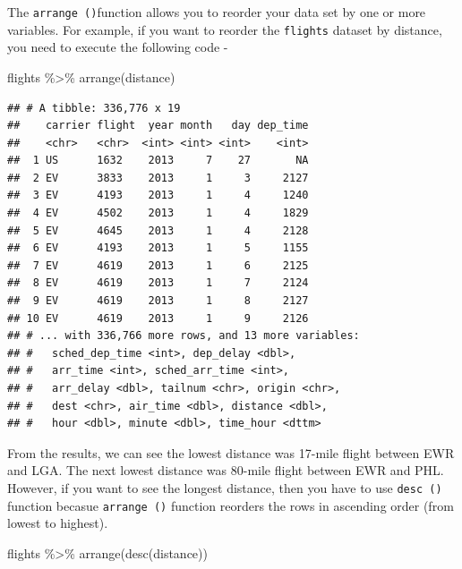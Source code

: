 \documentclass[
]{book}
\newenvironment{Shaded}{\begin{snugshade}}{\end{snugshade}}
\newcommand{\FunctionTok}[1]{\textcolor[rgb]{0.00,0.00,0.00}{#1}}
\newcommand{\NormalTok}[1]{#1}
\newcommand{\SpecialCharTok}[1]{\textcolor[rgb]{0.00,0.00,0.00}{#1}}
\begin{document}
The \texttt{arrange\ ()}function allows you to reorder your data set by one or more variables.
For example, if you want to reorder the \texttt{flights} dataset by distance, you need to execute the following code -

\begin{Shaded}
\begin{Highlighting}[]
\NormalTok{flights }\SpecialCharTok{\%\textgreater{}\%} 
  \FunctionTok{arrange}\NormalTok{(distance)}
\end{Highlighting}
\end{Shaded}

\begin{verbatim}
## # A tibble: 336,776 x 19
##    carrier flight  year month   day dep_time
##    <chr>   <chr>  <int> <int> <int>    <int>
##  1 US      1632    2013     7    27       NA
##  2 EV      3833    2013     1     3     2127
##  3 EV      4193    2013     1     4     1240
##  4 EV      4502    2013     1     4     1829
##  5 EV      4645    2013     1     4     2128
##  6 EV      4193    2013     1     5     1155
##  7 EV      4619    2013     1     6     2125
##  8 EV      4619    2013     1     7     2124
##  9 EV      4619    2013     1     8     2127
## 10 EV      4619    2013     1     9     2126
## # ... with 336,766 more rows, and 13 more variables:
## #   sched_dep_time <int>, dep_delay <dbl>,
## #   arr_time <int>, sched_arr_time <int>,
## #   arr_delay <dbl>, tailnum <chr>, origin <chr>,
## #   dest <chr>, air_time <dbl>, distance <dbl>,
## #   hour <dbl>, minute <dbl>, time_hour <dttm>
\end{verbatim}

From the results, we can see the lowest distance was 17-mile flight between EWR and LGA. The next lowest distance was 80-mile flight between EWR and PHL. However, if you want to see the longest distance, then you have to use \texttt{desc\ ()} function becasue \texttt{arrange\ ()} function reorders the rows in ascending order (from lowest to highest).

\begin{Shaded}
\begin{Highlighting}[]
\NormalTok{flights }\SpecialCharTok{\%\textgreater{}\%} 
  \FunctionTok{arrange}\NormalTok{(}\FunctionTok{desc}\NormalTok{(distance))}
\end{Highlighting}
\end{Shaded}
\end{document}
